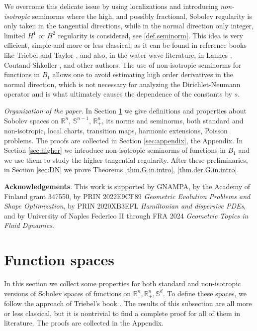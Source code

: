\documentclass[10pt,reqno,a4paper]{article}
\numberwithin{equation}{section}
\theoremstyle{plain}
\theoremstyle{definition}
\newcommand{\R}{{\mathbb R}}
\renewcommand{\S}{{\mathbb S}}
\begin{document}
We overcome this delicate issue by using localizations and introducing 
\emph{non-isotropic} seminorms where the high, and possibly fractional, Sobolev regularity 
is only taken in the tangential directions, 
while in the normal direction only integer, limited $H^1$ or $H^2$ regularity is considered, 
see \eqref{def.seminorm}. 
This idea is very efficient, simple and more or less classical, 
as it can be found in reference books like Triebel \cite[section 4.2.1]{Triebel.1983}
and Taylor \cite[section 5.11]{Taylor.volume.1}, 
and also, in the water wave literature, in Lannes \cite{Lannes.book},  
Coutand-Shkoller \cite{Coutand.Shkoller}, and other authors.  
The use of non-isotropic seminorms for functions in $B_1$ 
allows one to avoid estimating high order derivatives in the normal direction, 
which is not necessary for analyzing the Dirichlet-Neumann operator 
and is what ultimately causes the dependence of the constants by $s$. 


\medskip

\emph{Organization of the paper}. 
In Section \ref{sec:new.01} we give definitions and properties about Sobolev spaces 
on $\R^n$, $\S^{n-1}$, $\R^n_+$, its norms and seminorms, both standard and non-isotropic, 
local charts, transition maps, harmonic extensions, Poisson problems. 
The proofs are collected in Section \ref{sec:appendix}, the Appendix. 
In Section \ref{sec:higher} we introduce non-isotropic seminorms of functions in $B_1$
and we use them to study the higher tangential regularity.
After these preliminaries, in Section \ref{sec:DN} we prove Theorems \ref{thm.G.in.intro}, 
\ref{thm.der.G.in.intro}.


\medskip


\textbf{Acknowledgements}. 
This work is supported by GNAMPA, 
by the Academy of Finland grant 347550,
by PRIN 2022E9CF89 \emph{Geometric Evolution Problems and Shape Optimization},
by PRIN 2020XB3EFL \emph{Hamiltonian and dispersive PDEs}, 
and by University of Naples Federico II through FRA 2024 \emph{Geometric Topics in Fluid Dynamics}. 








\section{Function spaces}
\label{sec:new.01}

In this section we collect some properties for both standard and non-isotropic versions 
of Sobolev spaces of functions on $\R^n, \R^n_+, \S^d$. 
To define these spaces, we follow the approach of Triebel's book \cite{Triebel.1983}.
The results of this subsection are all more or less classical, 
but it is nontrivial to find a complete proof for all of them in literature. 
The proofs are collected in the Appendix. 
\end{document}
